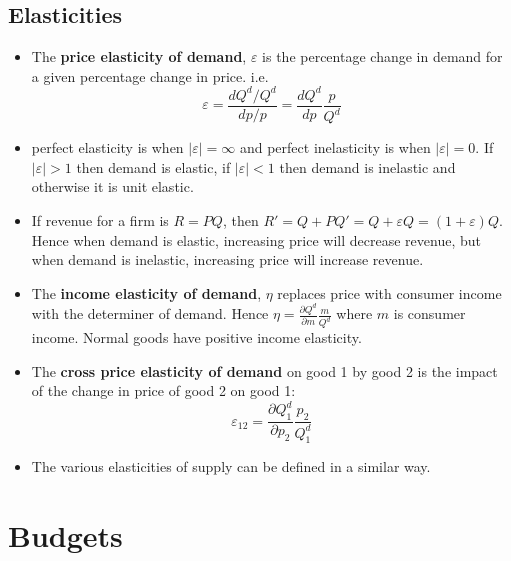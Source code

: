 \documentclass[a4paper]{article}
\begin{document}
\subsection{Elasticities}
\begin{itemize}
    \item The \textbf{price elasticity of demand}, $\varepsilon$ is the percentage change in demand for a given percentage change in price. i.e. $$\varepsilon = \frac{dQ^d/Q^d}{dp/p} = \frac{dQ^d}{dp} \frac{p}{Q^d}$$
    \item perfect elasticity is when $|\varepsilon| = \infty$ and perfect inelasticity is when $|\varepsilon| = 0$. If $|\varepsilon| > 1$ then demand is elastic, if $|\varepsilon| < 1$ then demand is inelastic and otherwise it is unit elastic. 
    \item If revenue for a firm is $R = PQ$, then $R' = Q + PQ' = Q + \varepsilon Q = (1 + \varepsilon)Q$. Hence when demand is elastic, increasing price will decrease revenue, but when demand is inelastic, increasing price will increase revenue. 
    \item The \textbf{income elasticity of demand}, $\eta$ replaces price with consumer income with the determiner of demand. Hence $\eta = \frac{\partial{Q^d}}{\partial{m}}\frac{m}{Q^d}$ where $m$ is consumer income. Normal goods have positive income elasticity. 
    \item The \textbf{cross price elasticity of demand} on good 1 by good 2 is the impact of the change in price of good 2 on good 1: $$\varepsilon_{12} = \frac{\partial{Q^d_1}}{\partial{p_2}}\frac{p_2}{Q^d_1}$$
    \item The various elasticities of supply can be defined in a similar way.
\end{itemize}

\section{Budgets}
\end{document}

